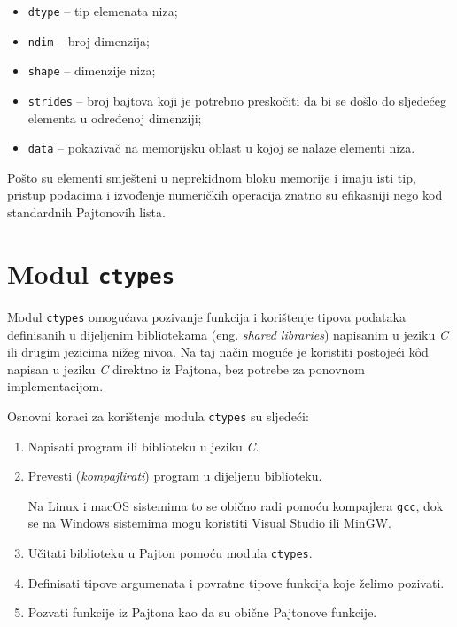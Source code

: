 \begin{itemize}
	\item \texttt{dtype} -- tip elemenata niza;
	\item \texttt{ndim} -- broj dimenzija;
	\item \texttt{shape} -- dimenzije niza;
	\item \texttt{strides} -- broj bajtova koji je potrebno preskočiti da bi se došlo do sljedećeg elementa u određenoj dimenziji;
	\item \texttt{data} -- pokazivač na memorijsku oblast u kojoj se nalaze elementi niza.
\end{itemize}

Pošto su elementi smješteni u neprekidnom bloku memorije i imaju isti tip, pristup podacima i izvođenje numeričkih operacija znatno su efikasniji nego kod standardnih Pajtonovih lista.

\section{Modul \texttt{ctypes}}

Modul \texttt{ctypes} omogućava pozivanje funkcija i korištenje tipova podataka definisanih u dijeljenim bibliotekama (eng. \textit{shared libraries}) napisanim u jeziku \textit{C} ili drugim jezicima nižeg nivoa. Na taj način moguće je koristiti postojeći kôd napisan u jeziku \textit{C} direktno iz Pajtona, bez potrebe za ponovnom implementacijom.

Osnovni koraci za korištenje modula \texttt{ctypes} su sljedeći:

\begin{enumerate}
	\item Napisati program ili biblioteku u jeziku \textit{C}.

	\item Prevesti (\textit{kompajlirati}) program u dijeljenu biblioteku.
	
	Na Linux i macOS sistemima to se obično radi pomoću kompajlera \texttt{gcc}, dok se na Windows sistemima mogu koristiti Visual Studio ili MinGW.
	
	\item Učitati biblioteku u Pajton pomoću modula \texttt{ctypes}.
	
	\item Definisati tipove argumenata i povratne tipove funkcija koje želimo pozivati.
	
	\item Pozvati funkcije iz Pajtona kao da su obične Pajtonove funkcije.
\end{enumerate}

